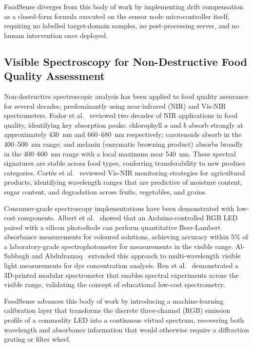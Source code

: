 \documentclass{ieeeaccess}
\begin{document}
FoodSense diverges from this body of work by implementing drift compensation as a closed-form formula executed on the sensor node microcontroller itself, requiring no labelled target-domain samples, no post-processing server, and no human intervention once deployed.

\subsection{Visible Spectroscopy for Non-Destructive Food Quality Assessment}

Non-destructive spectroscopic analysis has been applied to food quality assurance for several decades, predominantly using near-infrared (NIR) and Vis-NIR spectrometers. Fodor et al.~\cite{Fodor2024} reviewed two decades of NIR applications in food quality, identifying key absorption peaks: chlorophyll $a$ and $b$ absorb strongly at approximately 430~nm and 660--680~nm respectively; carotenoids absorb in the 400--500~nm range; and melanin (enzymatic browning product) absorbs broadly in the 400--600~nm range with a local maximum near 540~nm. These spectral signatures are stable across food types, conferring transferability to new produce categories. Cort{\'e}s et al.~\cite{Cortes2019} reviewed Vis-NIR monitoring strategies for agricultural products, identifying wavelength ranges that are predictive of moisture content, sugar content, and degradation across fruits, vegetables, and grains.

Consumer-grade spectroscopy implementations have been demonstrated with low-cost components. Albert et al.~\cite{Albert2012} showed that an Arduino-controlled RGB LED paired with a silicon photodiode can perform quantitative Beer-Lambert absorbance measurements for coloured solutions, achieving accuracy within 5\% of a laboratory-grade spectrophotometer for measurements in the visible range. Al-Sabbagh and Abdulrazzaq~\cite{AlSabbagh2022} extended this approach to multi-wavelength visible light measurements for dye concentration analysis. Ren et al.~\cite{Ren2023} demonstrated a 3D-printed modular spectrometer that enables spectral experiments across the visible range, validating the concept of educational low-cost spectrometry.

FoodSense advances this body of work by introducing a machine-learning calibration layer that transforms the discrete three-channel (RGB) emission profile of a commodity LED into a continuous virtual spectrum, recovering both wavelength and absorbance information that would otherwise require a diffraction grating or filter wheel.
\end{document}
